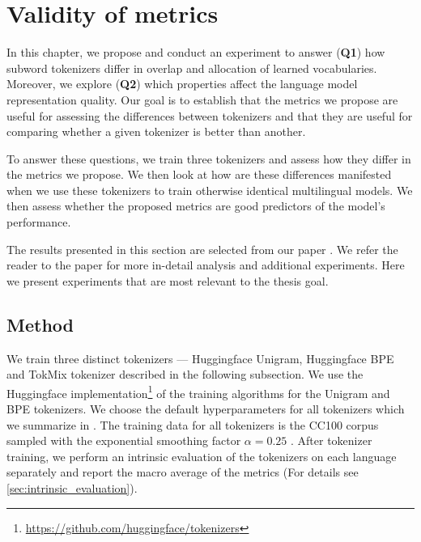 \chapter{Validity of metrics}
\label{chap:experiment_1_validity}


In this chapter, we propose and conduct an experiment to answer (\textbf{Q1}) how subword tokenizers differ in overlap and allocation of learned vocabularies. Moreover, we explore (\textbf{Q2}) which properties affect the language model representation quality. Our goal is to establish that the metrics we propose are useful for assessing the differences between tokenizers and that they are useful for comparing whether a given tokenizer is better than another.

To answer these questions, we train three tokenizers and assess how they differ in the metrics we propose. We then look at how are these differences manifested when we use these tokenizers to train otherwise identical multilingual models. We then assess whether the proposed metrics are good predictors of the model's performance.  

The results presented in this section are selected from our paper \citet{limisiewicz_tokenization_2023}. We refer the reader to the paper for more in-detail analysis and additional experiments. Here we present experiments that are most relevant to the thesis goal.

\section{Method}

We train three distinct tokenizers --- Huggingface Unigram, Huggingface BPE and TokMix tokenizer \cite{limisiewicz_tokenization_2023} described in the following subsection. We use the Huggingface implementation\footnote{\href{https://github.com/huggingface/tokenizers}{https://github.com/huggingface/tokenizers}} of the training algorithms for the Unigram and BPE tokenizers. We choose the default hyperparameters for all tokenizers which we summarize in . The training data for all tokenizers is the CC100 corpus sampled with the exponential smoothing factor $\alpha=0.25$ .
After tokenizer training, we perform an intrinsic evaluation of the tokenizers on each language separately and report the macro average of the metrics (For details see \autoref{sec:intrinsic_evaluation}).


